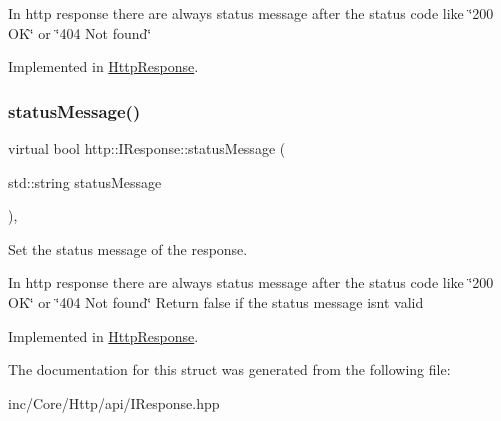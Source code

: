In http response there are always status message after the status code like \char`\"{}200 O\+K\char`\"{} or \char`\"{}404 Not found\char`\"{} 

Implemented in \hyperlink{classHttpResponse_a5463015a6d521c4c4da46505c0740f63}{Http\+Response}.

\mbox{\label{structhttp_1_1IResponse_ae2a223c2d714b456f2a064e13cafc2e2}} 
\subsubsection{\texorpdfstring{status\+Message()}{statusMessage()}\hspace{0.1cm}{\footnotesize\ttfamily [2/2]}}
{\footnotesize\ttfamily virtual bool http\+::\+I\+Response\+::status\+Message (\begin{DoxyParamCaption}\item[{std\+::string}]{status\+Message }\end{DoxyParamCaption})\hspace{0.3cm}{\ttfamily [pure virtual]}, {\ttfamily [noexcept]}}



Set the status message of the response. 

In http response there are always status message after the status code like \char`\"{}200 O\+K\char`\"{} or \char`\"{}404 Not found\char`\"{} Return false if the status message isn\textquotesingle{}t valid 

Implemented in \hyperlink{classHttpResponse_ad705d5d1846c261e2ca80c24c9e1d75c}{Http\+Response}.



The documentation for this struct was generated from the following file\+:\begin{DoxyCompactItemize}
\item 
inc/\+Core/\+Http/api/I\+Response.\+hpp\end{DoxyCompactItemize}

